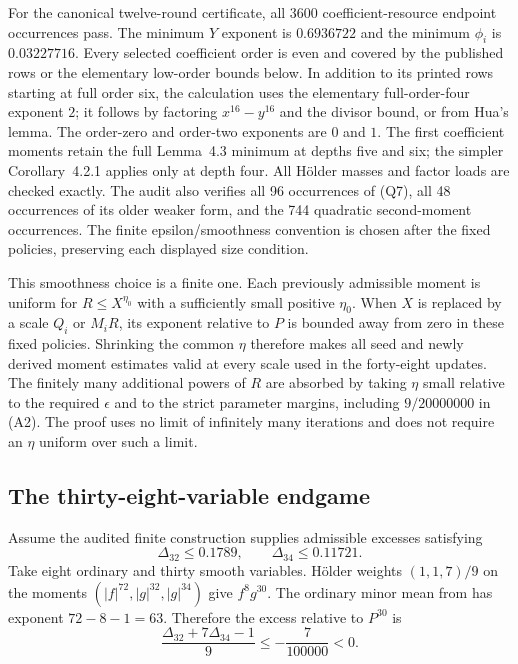 \documentclass[11pt,letterpaper]{article}
\numberwithin{equation}{section}
\begin{document}
For the canonical twelve-round certificate, all 3600 coefficient-resource
endpoint occurrences pass. The minimum $Y$ exponent is $0.6936722$ and the
minimum $\phi_i$ is $0.03227716$. Every selected coefficient order is even
and covered by the published rows or the elementary low-order bounds below.
In addition to its printed rows starting
at full order six, the calculation uses the elementary full-order-four
exponent $2$; it follows by factoring $x^{16}-y^{16}$ and the divisor bound,
or from Hua's lemma. The order-zero and order-two exponents are $0$ and $1$.
The first coefficient moments retain the full
Lemma~4.3 minimum at depths five and six; the simpler Corollary~4.2.1
applies only at depth four. All H\"older masses and factor loads are
checked exactly. The audit also verifies all 96 occurrences of (Q7), all
48 occurrences of its older weaker form, and the 744 quadratic second-moment
occurrences. The finite epsilon/smoothness convention is chosen after the
fixed policies, preserving each displayed size condition.

This smoothness choice is a finite one. Each previously admissible moment is
uniform for $R\le X^{\eta_0}$ with a sufficiently small positive $\eta_0$.
When $X$ is replaced by a scale $Q_i$ or $M_iR$, its exponent relative to
$P$ is bounded away from zero in these fixed policies. Shrinking the common
$\eta$ therefore makes all seed and newly derived moment estimates valid
at every scale used in the forty-eight updates. The finitely many additional
powers of $R$ are absorbed by taking $\eta$ small relative to the required
$\epsilon$ and to the strict parameter margins, including $9/20000000$ in
(A2). The proof uses no limit of infinitely many iterations and does not
require an $\eta$ uniform over such a limit.

\subsection{The thirty-eight-variable endgame}

Assume the audited finite construction supplies admissible excesses satisfying
\[
 \Delta_{32}\le0.1789,\qquad\Delta_{34}\le0.11721.
\]
Take eight ordinary and thirty smooth variables. H\"older weights
$(1,1,7)/9$ on the moments $(|f|^{72},|g|^{32},|g|^{34})$ give
$f^8g^{30}$. The ordinary minor mean from \cite[Lemma~3.1]{W16} has exponent
$72-8-1=63$. Therefore the excess relative to $P^{30}$ is
\[
 \frac{\Delta_{32}+7\Delta_{34}-1}{9}
       \le-\frac7{100000}<0.                              \tag{E1}
\]
\end{document}
